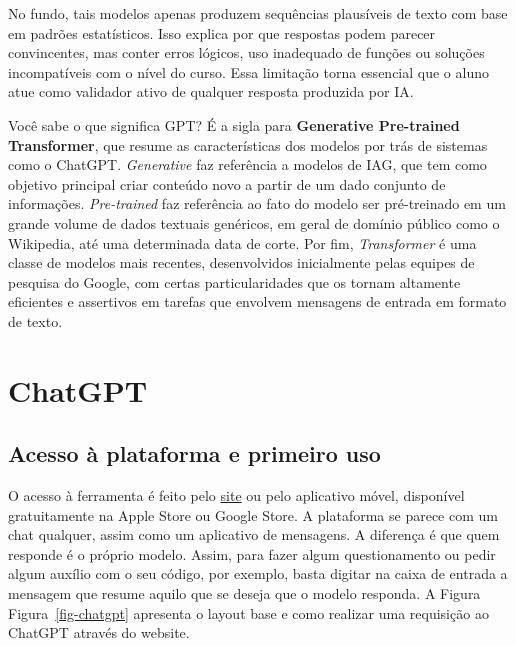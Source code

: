 \documentclass[
  brazilian,
  letterpaper,
  DIV=11,
  numbers=noendperiod]{scrreprt}
\begin{document}
No fundo, tais modelos apenas produzem sequências plausíveis de texto
com base em padrões estatísticos. Isso explica por que respostas podem
parecer convincentes, mas conter erros lógicos, uso inadequado de
funções ou soluções incompatíveis com o nível do curso. Essa limitação
torna essencial que o aluno atue como validador ativo de qualquer
resposta produzida por IA.

\begin{tcolorbox}[enhanced jigsaw, breakable, coltitle=black, title=\textcolor{quarto-callout-note-color}{\faInfo}\hspace{0.5em}{Curiosidade}, titlerule=0mm, colbacktitle=quarto-callout-note-color!10!white, opacitybacktitle=0.6, arc=.35mm, bottomrule=.15mm, toptitle=1mm, opacityback=0, colback=white, bottomtitle=1mm, toprule=.15mm, rightrule=.15mm, left=2mm, colframe=quarto-callout-note-color-frame, leftrule=.75mm]

Você sabe o que significa GPT? É a sigla para \textbf{Generative
Pre-trained Transformer}, que resume as características dos modelos por
trás de sistemas como o ChatGPT. \emph{Generative} faz referência a
modelos de IAG, que tem como objetivo principal criar conteúdo novo a
partir de um dado conjunto de informações. \emph{Pre-trained} faz
referência ao fato do modelo ser pré-treinado em um grande volume de
dados textuais genéricos, em geral de domínio público como o Wikipedia,
até uma determinada data de corte. Por fim, \emph{Transformer} é uma
classe de modelos mais recentes, desenvolvidos inicialmente pelas
equipes de pesquisa do Google, com certas particularidades que os tornam
altamente eficientes e assertivos em tarefas que envolvem mensagens de
entrada em formato de texto.

\end{tcolorbox}

\section{ChatGPT}\label{chatgpt}

\subsection{Acesso à plataforma e primeiro
uso}\label{acesso-uxe0-plataforma-e-primeiro-uso}

O acesso à ferramenta é feito pelo \href{https://chatgpt.com/}{site} ou
pelo aplicativo móvel, disponível gratuitamente na Apple Store ou Google
Store. A plataforma se parece com um chat qualquer, assim como um
aplicativo de mensagens. A diferença é que quem responde é o próprio
modelo. Assim, para fazer algum questionamento ou pedir algum auxílio
com o seu código, por exemplo, basta digitar na caixa de entrada a
mensagem que resume aquilo que se deseja que o modelo responda. A Figura
Figura~\ref{fig-chatgpt} apresenta o layout base e como realizar uma
requisição ao ChatGPT através do website.
\end{document}
